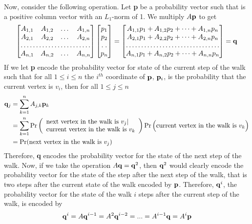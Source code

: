 \documentclass[psamsfonts, 10pt]{amsart}
\theoremstyle{definition}
\theoremstyle{remark}
\numberwithin{equation}{section}
\begin{document}
Now, consider the following operation. Let {\bf p} be a probability vector such that {\bf} is a positive column vector with an $L_1$-norm of 1. We multiply $A{\bf p}$ to get
\[
\begin{bmatrix}
    A_{1,1}    &  A_{1,2}  & \dots &  A_{1,n}  \\
   A_{2,1}       &  A_{2,2}   & \dots &  A_{2,n}   \\
    \hdotsfor{4} \\
     A_{n,1}        & A_{n,2}  & \dots &  A_{n,n} 
\end{bmatrix}
\begin{bmatrix}
    p_1 \\
   p_2 \\
    \hdotsfor{1} \\
     p_n \\
\end{bmatrix}
=
\begin{bmatrix}
    A_{1,1}p_1 + A_{1,2}p_2 + \dots + A_{1,n}p_n \\
    A_{2,1}p_1 + A_{2,2}p_2 + \dots + A_{2,n}p_n \\
    \hdotsfor{1} \\
      A_{n,1}p_1 + A_{n,2}p_2 + \dots + A_{n,n}p_n \\
\end{bmatrix}
=
{\bf q}
\]
If we let {\bf p} encode the probability vector for state of the current step of the walk such that for all $1 \leq i \leq n$ the $i^{th}$ coordinate of ${\bf p}$, ${\bf p}_i$, is the probability that the current vertex is $v_i$, then for all $1 \leq j \leq n$
\[
\begin{aligned}
{\bf q}_j &= \sum_{k =1}^nA_{j,k}{\bf p}_k\\
&= \sum_{k=1}^n \Pr\left(\begin{array}{l}
    \text{next vertex in the walk is }v_j \lvert \\
    \text{current vertex in the walk is }v_k 
  \end{array}\right)\Pr\Big(\text{current vertex in the walk is }v_k\Big)\\
&= \Pr(\text{next vertex in the walk is }v_j)
\end{aligned}
\]
Therefore, {\bf q} encodes the probability vector for the state of the next step of the walk. Now, if we take the operation $A{\bf q} = {\bf q}^2$, then ${\bf q}^2$ would clearly encode the probability vector for the state of the step after the next step of the walk, that is two steps after the current state of the walk encoded by ${\bf p}$. Therefore, ${\bf q}^i$, the probability vector for the state of the walk $i$ steps after the current step of the walk, is encoded by 
\[
{\bf q}^i = A{\bf q}^{i-1} = A^2{\bf q}^{i-2} = ... = A^{i-1}{\bf q} = A^i{\bf p}
\]
\end{document}
